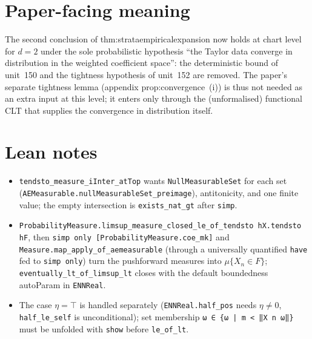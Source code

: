 \documentclass[11pt]{article}
\begin{document}
\section{Paper-facing meaning}
The second conclusion of thm:strataempiricalexpansion now holds at chart level for $d=2$ under the
sole probabilistic hypothesis ``the Taylor data converge in distribution in the weighted coefficient
space'': the deterministic bound of unit~150 and the tightness hypothesis of unit~152 are removed.
The paper's separate tightness lemma (appendix prop:convergence~(i)) is thus not needed as an extra
input at this level; it enters only through the (unformalised) functional CLT that supplies the
convergence in distribution itself.

\section{Lean notes}
\begin{itemize}
\item \texttt{tendsto\_measure\_iInter\_atTop} wants \texttt{NullMeasurableSet} for each set
(\texttt{AEMeasurable.nullMeasurableSet\_preimage}), antitonicity, and one finite value; the empty
intersection is \texttt{exists\_nat\_gt} after \texttt{simp}.
\item \texttt{ProbabilityMeasure.limsup\_measure\_closed\_le\_of\_tendsto hX.tendsto hF}, then
\texttt{simp only [ProbabilityMeasure.coe\_mk]} and \texttt{Measure.map\_apply\_of\_aemeasurable}
(through a universally quantified \texttt{have} fed to \texttt{simp only}) turn the pushforward
measures into $\mu\{X_n\in F\}$; \texttt{eventually\_lt\_of\_limsup\_lt} closes with the default
boundedness autoParam in \texttt{ENNReal}.
\item The case $\eta=\top$ is handled separately (\texttt{ENNReal.half\_pos} needs $\eta\ne0$,
\texttt{half\_le\_self} is unconditional); set membership \texttt{ω ∈ \{ω | m < ‖X n ω‖\}} must be
unfolded with \texttt{show} before \texttt{le\_of\_lt}.
\end{itemize}
\end{document}
